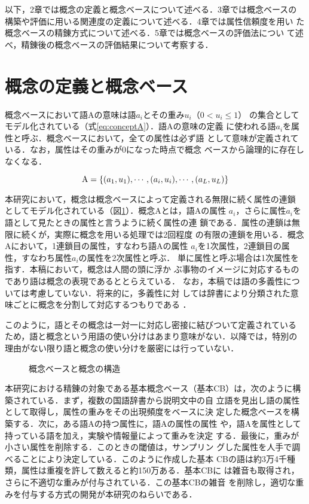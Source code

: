 以下，2章では概念の定義と概念ベースについて述べる．3章では概念ベースの
構築や評価に用いる関連度の定義について述べる．4章では属性信頼度を用い
た概念ベースの精錬方式について述べる．5章では概念ベースの評価法につい
て述べ，精錬後の概念ベースの評価結果について考察する．

\section{概念の定義と概念ベース}

概念ベースにおいて語Aの意味は語$a_i$とその重み$u_i$（$0 < u_i \le 1$）
の集合としてモデル化されている（式\ref{eq:conceptA}）．語Aの意味の定義
に使われる語$a_i$を属性と呼ぶ．概念ベースにおいて，全ての属性は必ず語
として意味が定義されている．なお，属性はその重みが0になった時点で概念
ベースから論理的に存在しなくなる．

\begin{equation}
  {\rm A} = \{(a_1, u_1), \cdots , (a_i, u_i),\cdots , (a_L, u_L)\}
  \label{eq:conceptA}
\end{equation}

本研究において，概念は概念ベースによって定義される無限に続く属性の連鎖
としてモデル化されている（図\ref{fig:con_img}）．概念Aとは，語Aの属性
$a_i$，さらに属性$a_i$を語として見たときの属性と言うように続く属性の連
鎖である．属性の連鎖は無限に続くが，実際に概念を用いる処理では2回程度
の有限の連鎖を用いる．概念Aにおいて，1連鎖目の属性，すなわち語Aの属性
$a_i$を1次属性，2連鎖目の属性，すなわち属性$a_i$の属性を2次属性と呼ぶ．
単に属性と呼ぶ場合は1次属性を指す．本稿において，概念は人間の頭に浮か
ぶ事物のイメージに対応するものであり語は概念の表現であるととらえている．
なお，本稿では語の多義性については考慮していない．将来的に，多義性に対
しては辞書により分類された意味ごとに概念を分割して対応するつもりである
\cite{Yamanishi2001}．

このように，語とその概念は一対一に対応し密接に結びついて定義されている
ため，語と概念という用語の使い分けはあまり意味がない．以降では，特別の
理由がない限り語と概念の使い分けを厳密には行っていない．

\begin{figure}[ht]
  \begin{center}
    \caption{概念ベースと概念の構造}
    \label{fig:con_img}
  \end{center}
\end{figure}

本研究における精錬の対象である基本概念ベース（基本CB）は，次のように構
築されている\cite{Kasahara1997}．まず，複数の国語辞書から説明文中の自
立語を見出し語の属性として取得し，属性の重みをその出現頻度をベースに決
定した概念ベースを構築する．次に，ある語Aの持つ属性に，語Aの属性の属性
や，語Aを属性として持っている語を加え，実験や情報量によって重みを決定
する．最後に，重みが小さい属性を削除する．このときの閾値は，サンプリン
グした属性を人手で調べることにより決定している．このように作成した基本
CBの語は約3万4千種類，属性は重複を許して数えると約150万ある．基本CBに
は雑音も取得され，さらに不適切な重みが付与されている．この基本CBの雑音
を削除し，適切な重みを付与する方式の開発が本研究のねらいである．

